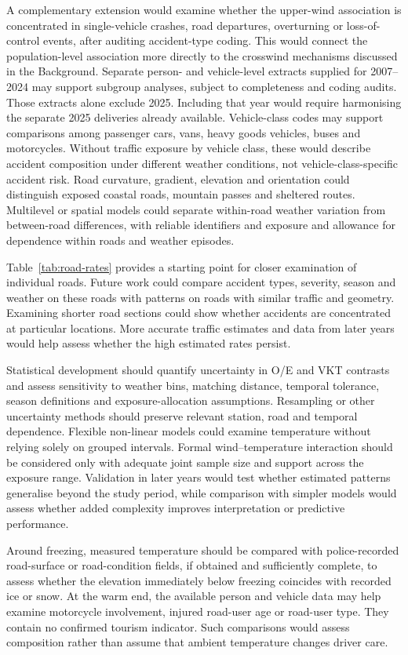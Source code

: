 A complementary extension would examine whether the upper-wind association is concentrated in single-vehicle crashes, road departures, overturning or loss-of-control events, after auditing accident-type coding. This would connect the population-level association more directly to the crosswind mechanisms discussed in the Background. Separate person- and vehicle-level extracts supplied for 2007--2024 may support subgroup analyses, subject to completeness and coding audits. Those extracts alone exclude 2025. Including that year would require harmonising the separate 2025 deliveries already available. Vehicle-class codes may support comparisons among passenger cars, vans, heavy goods vehicles, buses and motorcycles. Without traffic exposure by vehicle class, these would describe accident composition under different weather conditions, not vehicle-class-specific accident risk. Road curvature, gradient, elevation and orientation could distinguish exposed coastal roads, mountain passes and sheltered routes. Multilevel or spatial models could separate within-road weather variation from between-road differences, with reliable identifiers and exposure and allowance for dependence within roads and weather episodes.

Table~\ref{tab:road-rates} provides a starting point for closer examination of individual
roads. Future work could compare accident types, severity, season and
weather on these roads with patterns on roads with similar traffic and
geometry. Examining shorter road sections could show whether accidents
are concentrated at particular locations. More accurate traffic estimates
and data from later years would help assess whether the high estimated
rates persist.

Statistical development should quantify uncertainty in O/E and VKT contrasts and assess sensitivity to weather bins, matching distance, temporal tolerance, season definitions and exposure-allocation assumptions. Resampling or other uncertainty methods should preserve relevant station, road and temporal dependence. Flexible non-linear models could examine temperature without relying solely on grouped intervals. Formal wind--temperature interaction should be considered only with adequate joint sample size and support across the exposure range. Validation in later years would test whether estimated patterns generalise beyond the study period, while comparison with simpler models would assess whether added complexity improves interpretation or predictive performance.

\begin{samepage}
Around freezing, measured temperature should be compared with police-recorded road-surface or road-condition fields, if obtained and sufficiently complete, to assess whether the elevation immediately below freezing coincides with recorded ice or snow. At the warm end, the available person and vehicle data may help examine motorcycle involvement, injured road-user age or road-user type. They contain no confirmed tourism indicator. Such comparisons would assess composition rather than assume that ambient temperature changes driver care.\par
\end{samepage}

